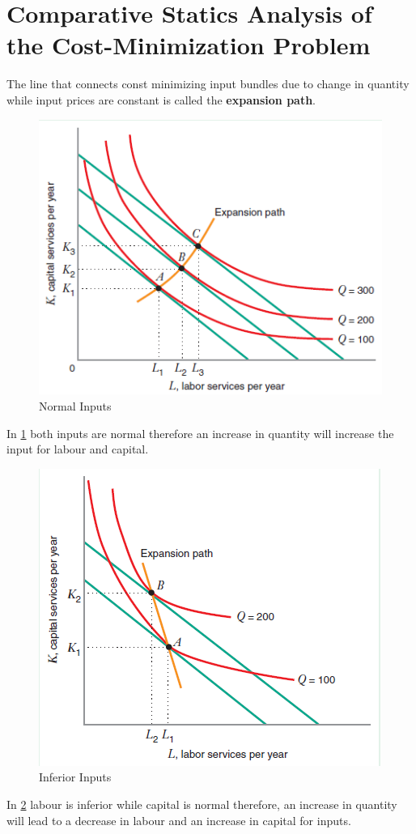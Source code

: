 \documentclass[../ECON-281-Notes.tex]{subfiles}
\begin{document}
\section{Comparative Statics Analysis of the Cost-Minimization Problem}
The line that connects const minimizing input bundles due to change in quantity while input prices are constant is called the \textbf{expansion path}.
\begin{figure}[h]
    \centering
    \includegraphics[width=\columnwidth]{../assets/expansion-path-pos.png}   
    \caption{Normal Inputs}
    \label{fig:normal_inputs}
\end{figure}
In \cref{fig:normal_inputs} both inputs are normal therefore an increase in quantity will increase the input for labour and capital.

\begin{figure}[h]
    \centering
    \includegraphics[width=\columnwidth]{../assets/expansion-path-neg.png}   
    \caption{Inferior Inputs}
    \label{fig:inferior_inputs}
\end{figure}
In \cref{fig:inferior_inputs} labour is inferior while capital is normal therefore, an increase in quantity will lead to a decrease in labour and an increase in capital for inputs. 
\end{document}
